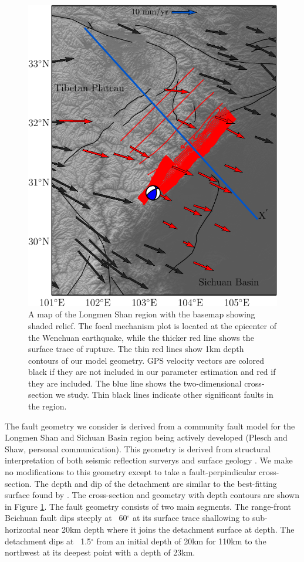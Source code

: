 \documentclass[12pt]{article}
\begin{document}
\begin{figure}[h!]
    \centering
    \includegraphics{figs/lms_map_all.pdf}
    \caption{A map of the Longmen Shan region with the basemap showing shaded relief. The focal mechanism plot is located at the epicenter of the Wenchuan earthquake, while the thicker red line shows the surface trace of rupture. The thin red lines show 1km depth contours of our model geometry. GPS velocity vectors are colored black if they are not included in our parameter estimation and red if they are included. The blue line shows the two-dimensional cross-section we study. Thin black lines indicate other significant faults in the region.}
    \label{fig:regional_map}
\end{figure}

The fault geometry we consider is derived from a community fault model for the Longmen Shan and Sichuan Basin region being actively developed (Plesch and Shaw, personal communication). This geometry is derived from structural interpretation of both seismic reflection surverys and surface geology \citep{Hubbard2010}. We make no modifications to this geometry except to take a fault-perpindicular cross-section. The depth and dip of the detachment are similar to the best-fitting surface found by \citet{Qi2011}. The cross-section and geometry with depth contours are shown in Figure \ref{fig:regional_map}. The fault geometry consists of two main segments. The range-front Beichuan fault dips steeply at ~60$^{\circ}$ at its surface trace shallowing to sub-horizontal near 20km depth where it joins the detachment surface at depth. The detachment dips at ~1.5$^{\circ}$ from an initial depth of 20km for 110km to the northwest at its deepest point with a depth of 23km.
\end{document}
